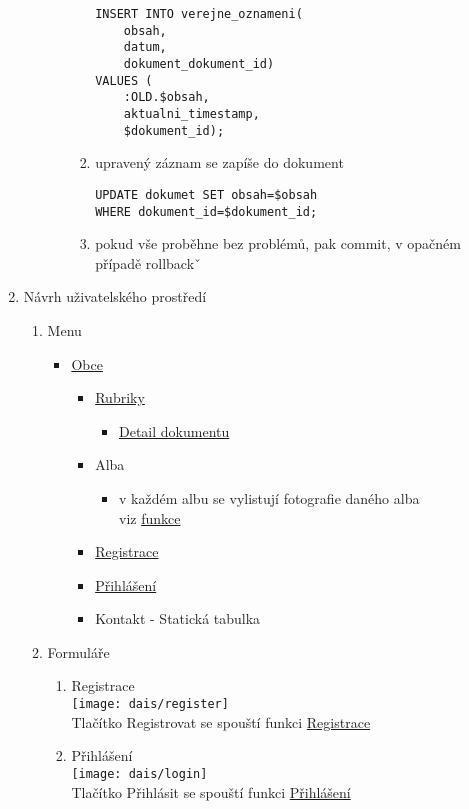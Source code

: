 \documentclass[12pt]{article}
\begin{document}
\begin{enumerate}
\begin{enumerate}[label*=\arabic*.]
\begin{enumerate}[label*=\arabic*.]
\begin{enumerate}[label=\arabic*.]
				\begin{lstlisting}
INSERT INTO verejne_oznameni(
	obsah, 
	datum, 
	dokument_dokument_id) 
VALUES (
	:OLD.$obsah, 
	aktualni_timestamp, 
	$dokument_id);
				\end{lstlisting} 
				\item upravený záznam se zapíše do dokument
				\begin{lstlisting}
UPDATE dokumet SET obsah=$obsah 
WHERE dokument_id=$dokument_id;
				\end{lstlisting}
				\item pokud vše proběhne bez problémů, pak commit, v opačném případě rollbackˇ
			\end{enumerate}
				
			\end{enumerate}%
		\end{enumerate}%
		\item Návrh uživatelského prostředí 
		\begin{enumerate}[label*=\arabic*.]
			\item Menu
			\begin{itemize}
				\item \hyperlink{5.1.3.3}{Obce} 
				\begin{itemize}
					\item \hyperlink{5.1.7.2}{Rubriky}
					\begin{itemize}
						\item \hyperlink{zobraz}{Detail dokumentu}
					\end{itemize}
					\item Alba
					\begin{itemize}
						\item v každém albu se vylistují fotografie daného alba\\
						viz \hyperlink{fotky}{funkce}
					\end{itemize}
					\item \hyperlink{5.1.1.1}{Registrace}
					\item \hyperlink{5.1.1.6}{Přihlášení}
					\item Kontakt - Statická tabulka					
				\end{itemize}
			\end{itemize}
		\newpage
			\item Formuláře
			\begin{enumerate}[label*=\arabic*.]
				\item Registrace\\
					\texttt{[image: dais/register]}\\
					Tlačítko Registrovat se spouští funkci \hyperlink{5.1.1.1}{Registrace}\\
				\item Přihlášení \\
					\texttt{[image: dais/login]}\\
					Tlačítko Přihlásit se spouští funkci \hyperlink{5.1.1.6}{Přihlášení}
			\end{enumerate}
		\end{enumerate}%
	\end{enumerate}%
\end{document}
